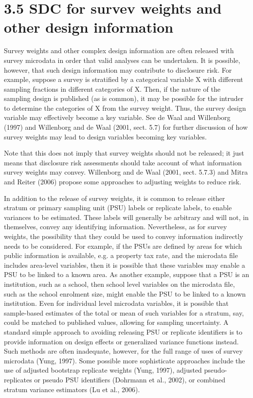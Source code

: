 \newpage
\section{3.5 SDC for survev weights and other design information}
Survey weights and other complex design information are often released with survey
microdata in order that valid analyses can be undertaken. It is possible, however, that
such design information may contribute to disclosure risk. For example, suppose a survey
is stratified by a categorical variable X with different sampling fractions in different
categories of X. Then, if the nature of the sampling design is published (as is common), it
may be possible for the intruder to determine the categories of X from the survey weight.
Thus, the survey design variable may effectively become a key variable. See de Waal and
Willenborg (1997) and Willenborg and de Waal (2001, sect. 5.7) for further discussion of
how survey weights may lead to design variables becoming key variables. 

Note that this does not imply that survey weights should not be released; it just means that disclosure
risk assessments should take account of what information survey weights may convey.
Willenborg and de Waal (2001, sect. 5.7.3) and Mitra and Reiter (2006) propose some approaches to adjusting weights to reduce risk.

In addition to the release of survey weights, it is common to release either stratum or
primary sampling unit (PSU) labels or replicate labels, to enable variances to be estimated. These labels will generally be arbitrary and will not, in themselves, convey any identifying information. Nevertheless, as for survey weights, the possibility that they
could be used to convey information indirectly needs to be considered. For example, if the PSUs are defined by areas for which public information is available, e.g. a property tax rate, and the microdata file includes area-level variables, then it is possible that these variables may enable a PSU to be linked to a known area. As another example, suppose that a PSU is an institution, such as a school, then school level variables on the microdata file, such as the school enrolment size, might enable the PSU to be linked to a known institution. Even for individual level microdata variables, it is possible that sample-based
estimates of the total or mean of such variables for a stratum, say, could be matched to
published values, allowing for sampling uncertainty.
A standard simple approach to avoiding releasing PSU or replicate identifiers is to
provide information on design effects or generalized variance functions instead. Such
methods are often inadequate, however, for the full range of uses of survey microdata
(Yung, 1997). Some possible more sophisticate approaches include the use of adjusted
bootstrap replicate weights (Yung, 1997), adjusted pseudo-replicates or pseudo PSU
identifiers (Dohrmann et al., 2002), or combined stratum variance estimators (Lu et al.,
2006).
